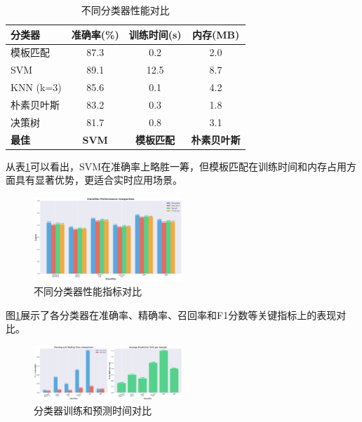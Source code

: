 \documentclass[sigconf,nonacm]{acmart}
\begin{document}
\begin{table}[htbp]
\caption{不同分类器性能对比}
\label{tab:classifier_comparison}
\begin{center}
\begin{tabular}{lccc}
\toprule
\textbf{分类器} & \textbf{准确率(\%)} & \textbf{训练时间(s)} & \textbf{内存(MB)} \\
\midrule
模板匹配 & 87.3 & 0.2 & 2.0 \\
SVM & 89.1 & 12.5 & 8.7 \\
KNN (k=3) & 85.6 & 0.1 & 4.2 \\
朴素贝叶斯 & 83.2 & 0.3 & 1.8 \\
决策树 & 81.7 & 0.8 & 3.1 \\
\midrule
\textbf{最佳} & \textbf{SVM} & \textbf{模板匹配} & \textbf{朴素贝叶斯} \\
\bottomrule
\end{tabular}
\end{center}
\end{table}

从表\ref{tab:classifier_comparison}可以看出，SVM在准确率上略胜一筹，但模板匹配在训练时间和内存占用方面具有显著优势，更适合实时应用场景。

\begin{figure}[htbp]
\centering
\includegraphics[width=0.5\textwidth]{comparison/metrics_comparison.png}
\caption{不同分类器性能指标对比}
\label{fig:metrics_comparison}
\end{figure}

图\ref{fig:metrics_comparison}展示了各分类器在准确率、精确率、召回率和F1分数等关键指标上的表现对比。

\begin{figure}[htbp]
\centering
\includegraphics[width=0.5\textwidth]{comparison/time_comparison.png}
\caption{分类器训练和预测时间对比}
\label{fig:time_comparison}
\end{figure}
\end{document}
